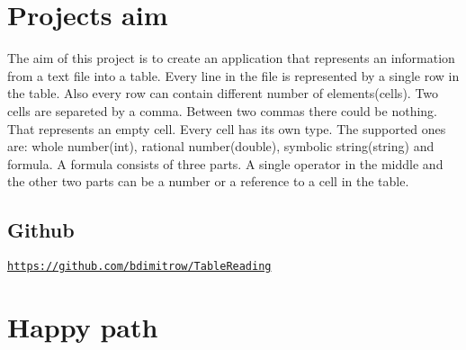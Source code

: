 \hypertarget{index_First}{}\section{Project\textquotesingle{}s aim}\label{index_First}
The aim of this project is to create an application that represents an information from a text file into a table. Every line in the file is represented by a single row in the table. Also every row can contain different number of elements(cells). Two cells are separeted by a comma. Between two commas there could be nothing. That represents an empty cell. Every cell has its own type. The supported ones are\+: whole number(int), rational number(double), symbolic string(string) and formula. A formula consists of three parts. A single operator in the middle and the other two parts can be a number or a reference to a cell in the table.\hypertarget{index_Github}{}\subsection{Github}\label{index_Github}
\href{https://github.com/bdimitrow/TableReading}{\tt https\+://github.\+com/bdimitrow/\+Table\+Reading}\hypertarget{index_Second}{}\section{Happy path}\label{index_Second}

